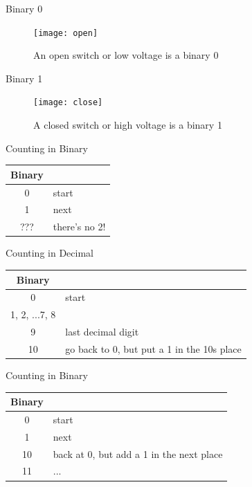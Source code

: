 \documentclass[xcolor={dvipsnames}]{beamer}
\begin{document}
\begin{frame}{Binary 0}
	\begin{figure}
		\texttt{[image: open]}
		\caption{An open switch or low voltage is a binary 0}
	\end{figure}
\end{frame}

\begin{frame}{Binary 1}
	\begin{figure}	
		\texttt{[image: close]}
		\caption{A closed switch or high voltage is a binary 1}
	\end{figure}
\end{frame}

\begin{frame}{Counting in Binary}
	\begin{center}
	\begin{tabular}{c | l}
		Binary & \\
		\hline
		0 & start\\
		1 & next \\
		??? & there's no 2! \\
	\end{tabular}
	\end{center}
\end{frame}


\begin{frame}{Counting in Decimal}
	\begin{center}
	\begin{tabular}{c | l}
		Binary & \\
		\hline
		0 & start \\
		1, 2, ...7, 8 & \\
		9 & last decimal digit \\
		10 & go back to 0, but put a 1 in the 10s place
	\end{tabular}
	\end{center}
\end{frame}

\begin{frame}{Counting in Binary}
	\begin{center}
	\begin{tabular}{c | l}
		Binary & \\
		\hline
		0 & start\\
		1 & next \\
		10 & back at 0, but add a 1 in the next place\\
		11 & ...
	\end{tabular}
	\end{center}
\end{frame}
\end{document}
